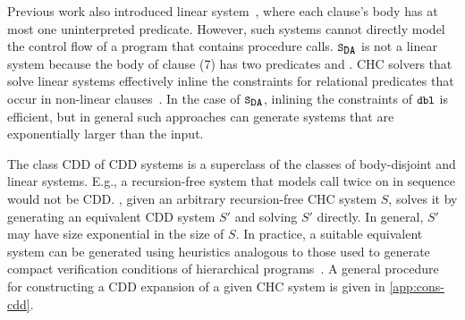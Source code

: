 Previous work also introduced linear system~\cite{albarghouthi12a},
where each clause's body has at most one uninterpreted predicate.
%
However, such systems cannot directly model the control flow of a
program that contains procedure calls.
%
$\mcchc$ is not a linear system because the body of clause (7) has two
predicates  and .
%
CHC solvers that solve linear systems effectively inline the
constraints for relational predicates that occur in non-linear
clauses~\cite{albarghouthi12b}.
%
In the case of $\mcchc$, inlining the constraints of $\cc{dbl}$ is
efficient, but in general such approaches can generate systems that
are exponentially larger than the input.

\begin{figure}
  
\end{figure}

The class CDD of CDD systems is a superclass of the classes of
body-disjoint and linear systems.
%
%
E.g., a recursion-free system that models  
call  twice on  in sequence would not
be CDD.
%
\sys, given an arbitrary recursion-free CHC system $S$,
solves it by generating an equivalent CDD system $S'$ and
solving $S'$ directly.
%
In general, $S'$ may have size exponential in the size of
$S$.
%
In practice, a suitable equivalent system can be generated using
heuristics analogous to those used to generate compact verification
conditions of hierarchical programs~\cite{flanagan01,lal-qadeer15}.
%
A general procedure for constructing a CDD expansion of a given CHC
system is given in \autoref{app:cons-cdd}.

